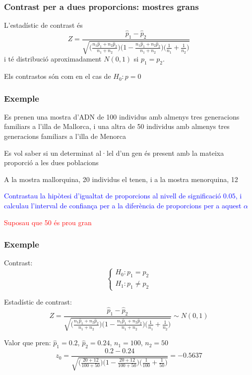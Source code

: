 \documentclass[12pt,t]{beamer}
\newcommand{\red}[1]{\textcolor{red}{#1}}
\newcommand{\blue}[1]{\textcolor{blue}{#1}}
\renewcommand{\emph}[1]{{\color{red}#1}}
\theoremstyle{plain}
\theoremstyle{definition}
\begin{document}
\begin{frame}
\frametitle{Contrast per a dues proporcions: mostres grans}

L'estadístic de contrast és
$$
Z=\frac{\widehat{p}_1 -\widehat{p}_2}{
\sqrt{\Big(\frac{n_1 \widehat{p}_1 +n_2 \widehat{p}_2}{n_1
+n_2}\Big)\Big(1-\frac{n_1 \widehat{p}_1 +n_2 \widehat{p}_2}{n_1
+n_2}\Big)\Big(\frac{1}{n_1}+\frac{1}{n_2}
\Big)}}$$
i té distribució aproximadament $N(0,1)$ si $p_1=p_2$.
\bigskip

Els contrastos són com en el cas de $H_0:p=0$

\end{frame}
\begin{frame}
\frametitle{Exemple}

Es prenen una mostra d'ADN de 100 individus amb almenys tres generacions
familiars a l'illa de Mallorca, i una altra de 50 individus amb almenys tres generacions
familiars a l'illa de  Menorca
\medskip

Es vol saber si un determinat al·lel d'un gen és present amb la mateixa proporció a les dues poblacions
\medskip

A la mostra mallorquina, 20 individus el tenen, i a la mostra menorquina, 12
\medskip

\blue{Contrastau la hipòtesi d'igualtat de proporcions al
nivell de significació $0.05$, i calculau l'interval de
confiança per a la diferència de proporcions per a aquest $\alpha$} 
\medskip

\red{Suposau que 50 és prou gran}



\end{frame}
\begin{frame}
\frametitle{Exemple}


\emph{Contrast}:
$$
\left\{\begin{array}{l}
H_0:p_1=p_2\\
H_1:p_1\neq p_2
\end{array}\right.
$$

\emph{Estadístic de contrast}: 
$$
Z=\frac{\widehat{p}_1 -\widehat{p}_2}{
\sqrt{\Big(\frac{n_1 \widehat{p}_1 +n_2 \widehat{p}_2}{n_1
+n_2}\Big)\Big(1-\frac{n_1 \widehat{p}_1 +n_2 \widehat{p}_2}{n_1
+n_2}\Big)\Big(\frac{1}{n_1}+\frac{1}{n_2}
\Big)}}\sim N(0,1)$$
\medskip

\emph{Valor que pren}: $\widehat{p}_1=0.2$, $\widehat{p}_2=0.24$, $n_1=100$, $n_2=50$
$$
z_0=\frac{0.2 -0.24}{
\sqrt{\Big(\frac{20 +12}{100+50}\Big)\Big(1-\frac{20 +12}{100+50}\Big)\Big(\frac{1}{100}+\frac{1}{50}
\Big)}}
=-0.5637$$

\end{frame}
\end{document}
